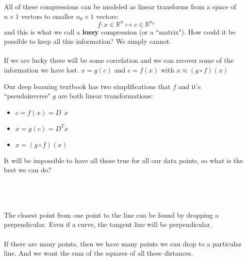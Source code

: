 \documentclass[12pt]{article}
\begin{document}
All of these compressions can be modeled as linear transforms from a space of $n \times 1 $ vectors to smaller $n_0 \times 1$ vectors:
$$ f: x \in \mathbb{R}^n \mapsto c \in \mathbb{R}^{n_0} $$
and this is what we call a \textbf{lossy} compression (or a ``matrix").  How could it be possible to keep all this information?  We simply cannot. \\ \\
If we are lucky there will be some correlation and we can recover some of the information we have lost. $x = g(c) $ and $c = f(x)$ with $x \approx (g \circ f)(x)$ 

\newpage

\noindent Our deep learning textbook has two simplifications that $f$ and it's ``pseudoinverse" $g$ are both linear transformations:
\begin{itemize}
\item $c = f(x) = D\;\,x$
\item $x = g(c) = D^T x$
\item $x = (g \circ f)(x) $
\end{itemize}
It will be impossible to have all these true for all our data points, so what is the best we can do? \\ \\
 \\ \\
The closest point from one point to the line can be found by dropping a perpendicular.  Even if a curve, the tangent line will be perpendicular. \\ \\
If there are many points, then we have many points we can drop to a particular line.  And we want the sum of the squares of all these distances.
\end{document}
